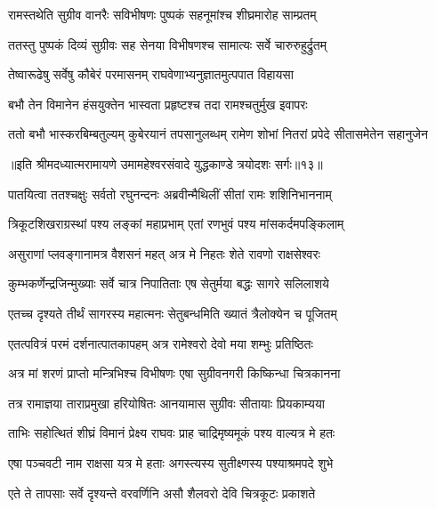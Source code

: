 \twolineshloka
{रामस्तथेति सुग्रीव वानरैः सविभीषणः}
{पुष्पकं सहनूमांश्च शीघ्रमारोह साम्प्रतम्} %

\twolineshloka
{ततस्तु पुष्पकं दिव्यं सुग्रीवः सह सेनया}
{विभीषणश्च सामात्यः सर्वे चारुरुहुर्द्रुतम्} %

\twolineshloka
{तेष्वारूढेषु सर्वेषु कौबेरं परमासनम्}
{राघवेणाभ्यनुज्ञातमुत्पपात विहायसा} %

\twolineshloka
{बभौ तेन विमानेन हंसयुक्तेन भास्वता}
{प्रहृष्टश्च तदा रामश्चतुर्मुख इवापरः} %

\fourlineindentedshloka
{ततो बभौ भास्करबिम्बतुल्यम्}
{कुबेरयानं तपसानुलब्धम्}
{रामेण शोभां नितरां प्रपेदे}
{सीतासमेतेन सहानुजेन} %

{॥इति श्रीमदध्यात्मरामायणे उमामहेश्वरसंवादे युद्धकाण्डे
त्रयोदशः सर्गः॥१३॥
}





\twolineshloka
{पातयित्वा ततश्चक्षुः सर्वतो रघुनन्दनः}
{अब्रवीन्मैथिलीं सीतां रामः शशिनिभाननाम्} %

\twolineshloka
{त्रिकूटशिखराग्रस्थां पश्य लङ्कां महाप्रभाम्}
{एतां रणभुवं पश्य मांसकर्दमपङ्किलाम्} %

\twolineshloka
{असुराणां प्लवङ्गानामत्र वैशसनं महत्}
{अत्र मे निहतः शेते रावणो राक्षसेश्वरः} %

\twolineshloka
{कुम्भकर्णेन्द्रजिन्मुख्याः सर्वे चात्र निपातिताः}
{एष सेतुर्मया बद्धः सागरे सलिलाशये} %

\twolineshloka
{एतच्च दृश्यते तीर्थं सागरस्य महात्मनः}
{सेतुबन्धमिति ख्यातं त्रैलोक्येन च पूजितम्} %

\twolineshloka
{एतत्पवित्रं परमं दर्शनात्पातकापहम्}
{अत्र रामेश्वरो देवो मया शम्भुः प्रतिष्ठितः} %

\twolineshloka
{अत्र मां शरणं प्राप्तो मन्त्रिभिश्च विभीषणः}
{एषा सुग्रीवनगरी किष्किन्धा चित्रकानना} %

\twolineshloka
{तत्र रामाज्ञया ताराप्रमुखा हरियोषितः}
{आनयामास सुग्रीवः सीतायाः प्रियकाम्यया} %

\twolineshloka
{ताभिः सहोत्थितं शीघ्रं विमानं प्रेक्ष्य राघवः}
{प्राह चाद्रिमृष्यमूकं पश्य वाल्यत्र मे हतः} %

\twolineshloka
{एषा पञ्चवटी नाम राक्षसा यत्र मे हताः}
{अगस्त्यस्य सुतीक्ष्णस्य पश्याश्रमपदे शुभे} %

\twolineshloka
{एते ते तापसाः सर्वे दृश्यन्ते वरवर्णिनि}
{असौ शैलवरो देवि चित्रकूटः प्रकाशते} %

